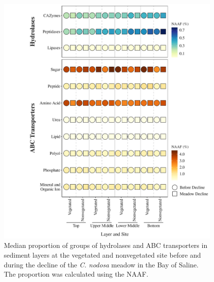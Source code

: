 \documentclass[
  12 pt,
]{article}
\begin{document}
\begin{figure}[H]

{\centering \includegraphics[width=0.9\linewidth]{../results/figures/heatmap_hydrolases_abc_transporters} 

}

\caption{Median proportion of groups of hydrolases and ABC transporters in sediment layers at the vegetated and nonvegetated site before and during the decline of the \emph{C. nodosa} meadow in the Bay of Saline. The proportion was calculated using the NAAF.}\label{fig:heatmap-hydrolases-abc-transporters}
\end{figure}
\end{document}
